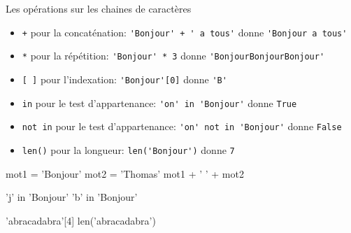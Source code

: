 \begin{easybox}{Les opérations sur les chaines de caractères}{}   
    \smallskip
    \begin{itemize}
        \item[] \texttt{+} \quad pour la concaténation:  \verb~'Bonjour' + ' a tous'~ donne \verb~'Bonjour a tous'~
        \item[] \texttt{*} \quad pour la répétition:  \verb~'Bonjour' * 3~ donne \verb~'BonjourBonjourBonjour'~
        \item[] \texttt{[ ]} \quad pour l'indexation:  \verb~'Bonjour'[0]~ donne \verb~'B'~
        \item[] \texttt{in} \quad pour le test d'appartenance:  \verb~'on' in 'Bonjour'~ donne \verb~True~
        \item[] \texttt{not in} \quad pour le test d'appartenance:  \verb~'on' not in 'Bonjour'~ donne \verb~False~
        \item[] \texttt{len()} \quad pour la longueur:  \verb~len('Bonjour')~ donne \verb~7~
       
    \end{itemize}
\end{easybox}


\begin{minipage}[t]{0.32\linewidth}
    \begin{ConsolePythontex}[TaillePolice=\normalsize, Label=false]{}
        mot1 = 'Bonjour'
        mot2 = 'Thomas'
        mot1 + ' ' + mot2
    \end{ConsolePythontex}
\end{minipage}\hfill
\begin{minipage}[t]{0.32\linewidth}
    \begin{ConsolePythontex}[TaillePolice=\normalsize, Label=false]{}
        'j' in 'Bonjour'
        'b' in 'Bonjour'
    \end{ConsolePythontex}
\end{minipage}\hfill{}
\begin{minipage}[t]{0.32\linewidth}
    \begin{ConsolePythontex}[TaillePolice=\normalsize, Label=false]{}
        'abracadabra'[4]
        len('abracadabra')
    \end{ConsolePythontex}
\end{minipage}

